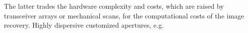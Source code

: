 The latter trades
the hardware complexity and
costs, which are raised by
transceiver arrays or
mechanical scans, for
the computational costs of
the image recovery.
Highly dispersive customized apertures, e.g.
%
